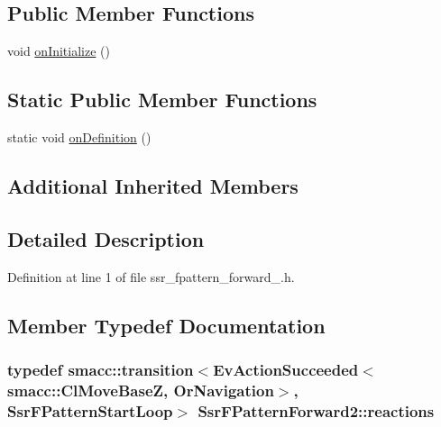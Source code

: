 \subsection*{Public Member Functions}
\begin{DoxyCompactItemize}
\item 
void \hyperlink{structSsrFPatternForward2_a81c19ada428b305cef1e21f39a090fa8}{on\+Initialize} ()
\end{DoxyCompactItemize}
\subsection*{Static Public Member Functions}
\begin{DoxyCompactItemize}
\item 
static void \hyperlink{structSsrFPatternForward2_a631add10c8ff5c96d45d54bdc5d918fc}{on\+Definition} ()
\end{DoxyCompactItemize}
\subsection*{Additional Inherited Members}


\subsection{Detailed Description}


Definition at line 1 of file ssr\+\_\+fpattern\+\_\+forward\+\_.\+h.



\subsection{Member Typedef Documentation}
\subsubsection[{\texorpdfstring{reactions}{reactions}}]{\setlength{\rightskip}{0pt plus 5cm}typedef {\bf smacc\+::transition}$<$Ev\+Action\+Succeeded$<${\bf smacc\+::\+Cl\+Move\+BaseZ}, {\bf Or\+Navigation}$>$, {\bf Ssr\+F\+Pattern\+Start\+Loop}$>$ {\bf Ssr\+F\+Pattern\+Forward2\+::reactions}}\hypertarget{structSsrFPatternForward2_adc3056f3a7551d387d3c1b8dae279e3b}{}\label{structSsrFPatternForward2_adc3056f3a7551d387d3c1b8dae279e3b}


